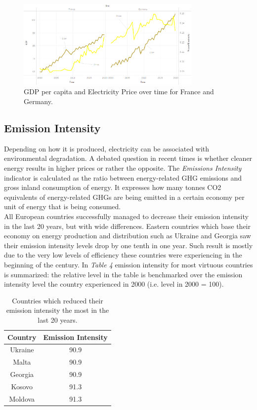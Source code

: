 \documentclass{book}
\begin{document}
\bigskip
\begin{figure}[H]
\begin{center}
\captionsetup{justification=centering}
\includegraphics[width=0.8\textwidth]{Images/pri-gdp.png}
\caption{GDP per capita and Electricity Price over time for France and Germany. }
\end{center}
\end{figure}
\bigskip

\subsection*{Emission Intensity}

Depending on how it is produced, electricity can be associated with environmental degradation. A debated question in recent times is whether cleaner energy results in higher prices or rather the opposite. The \textit{Emissions Intensity} indicator is calculated as the ratio between energy-related GHG emissions and gross inland consumption of energy. It expresses how many tonnes CO2 equivalents of energy-related GHGs are being emitted in a certain economy per unit of energy that is being consumed.\\

All European countries successfully managed to decrease their emission intensity in the last 20 years, but with wide differences. Eastern countries which base their economy on energy production and distribution such as Ukraine and Georgia saw their emission intensity levels drop by one tenth in one year. Such result is mostly due to the very low levels of efficiency these countries were experiencing in the beginning of the century. In \textit{Table 4} emission intensity for most virtuous countries is summarized: the relative level in the table is benchmarked over the emission intensity level the country experienced in 2000 (i.e. level in 2000 = 100).

\bigskip
\begin{table}[H]
\begin{center}
\begin{tabular}{|c|c|}
\hline
Country & Emission Intensity \\
\hline
Ukraine & 90.9\\
Malta & 90.9\\
Georgia & 90.9\\
Kosovo & 91.3\\
Moldova & 91.3\\
\hline
\end{tabular}
\caption{Countries which reduced their emission intensity the most in the last 20 years.}
\end{center}
\end{table}
\end{document}
